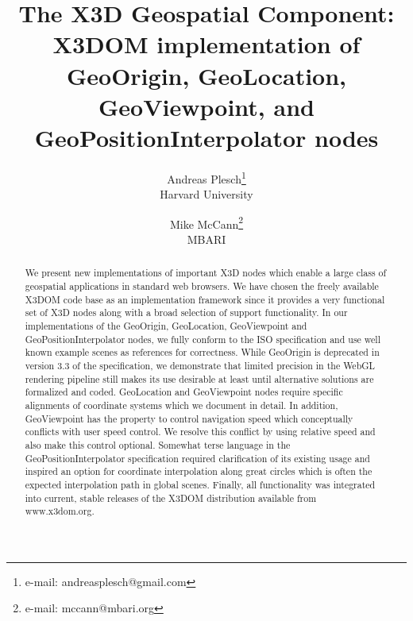 \documentclass[review]{acmsiggraph}            %
\title{The X3D Geospatial Component: X3DOM implementation of GeoOrigin, GeoLocation, GeoViewpoint,
and GeoPositionInterpolator nodes}
\author{Andreas Plesch\thanks{e-mail: andreasplesch@gmail.com}\\Harvard University \and Mike
McCann\thanks{e-mail: mccann@mbari.org}\\MBARI}
\begin{document}



\maketitle


\begin{abstract}

We present new implementations of important X3D nodes which enable a large class of geospatial
applications in standard web browsers. We have chosen the freely available X3DOM code base as an
implementation framework since it provides a very functional set of X3D nodes along with a broad
selection of support functionality. In our implementations of the GeoOrigin, GeoLocation,
GeoViewpoint and GeoPositionInterpolator nodes, we fully conform to the ISO specification and use
well known example scenes as references for correctness. While GeoOrigin is deprecated in version 3.3
of the specification, we demonstrate that limited precision in the WebGL rendering pipeline still
makes its use desirable at least until alternative solutions are formalized and coded. GeoLocation
and GeoViewpoint nodes require specific alignments of coordinate systems which we document in
detail. In addition, GeoViewpoint has the property to control navigation speed which conceptually
conflicts with user speed control. We resolve this conflict by using relative speed and also make
this control optional. Somewhat terse language in the GeoPositionInterpolator specification required
clarification of its existing usage and inspired an option for coordinate interpolation along great
circles which is often the expected interpolation path in global scenes. Finally, all functionality
was integrated into current, stable releases of the X3DOM distribution available from www.x3dom.org.

\end{abstract}
\end{document}
